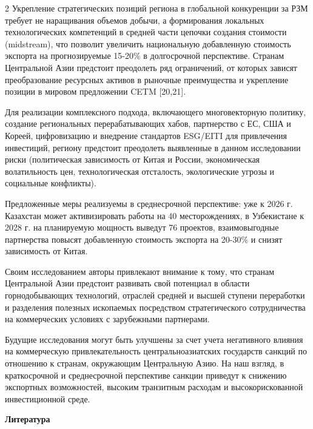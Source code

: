 \begin{multicols}{2}
Укрепление стратегических позиций региона в глобальной конкуренции за
РЗМ требует не наращивания объемов добычи, а формирования локальных
технологических компетенций в средней части цепочки создания стоимости
(midstream), что позволит увеличить национальную добавленную стоимость
экспорта на прогнозируемые 15-20\% в долгосрочной перспективе.
Странам Центральной Азии предстоит преодолеть ряд ограничений, от
которых зависят преобразование ресурсных активов в рыночные преимущества
и укрепление позиции в мировом предложении CETM {[}20,21{]}.~

Для реализации комплексного подхода, включающего многовекторную
политику, создание региональных перерабатывающих хабов, партнерство с
ЕС, США и Кореей, цифровизацию и внедрение стандартов ESG/EITI для
привлечения инвестиций, региону предстоит преодолеть выявленные в данном
исследовании риски (политическая зависимость от Китая и России,
экономическая волатильность цен, технологическая отсталость,
экологические угрозы и социальные конфликты).

Предложенные меры реализуемы в среднесрочной перспективе: уже к 2026 г.
Казахстан может активизировать работы на 40 месторождениях, в
Узбекистане к 2028 г. на планируемую мощность выведут 76 проектов,
взаимовыгодные партнерства повысят добавленную стоимость экспорта на
20-30\% и снизят зависимость от Китая.

Своим исследованием авторы привлекают внимание к тому, что странам
Центральной Азии предстоит развивать свой потенциал в области
горнодобывающих технологий, отраслей средней и высшей ступени
переработки и разделения полезных ископаемых посредством стратегического
сотрудничества на коммерческих условиях с зарубежными партнерами.

Будущие исследования могут быть улучшены за счет учета негативного
влияния на коммерческую привлекательность центральноазиатских государств
санкций по отношению к странам, окружающим Центральную Азию. На наш
взгляд, в краткосрочной и среднесрочной перспективе санкции приведут к
снижению экспортных возможностей, высоким транзитным расходам и
высокорискованной инвестиционной среде.
\end{multicols}

\begin{center}
{\bfseries Литература}
\end{center}

